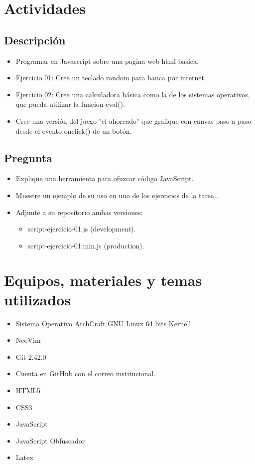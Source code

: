 \section{Actividades}
\subsection{Descripción}
\begin{itemize}
  \item Programar en Javascript sobre una pagina web html basica.
  \item Ejercicio 01: Cree un teclado random para banca por internet.
  \item Ejercicio 02: Cree una calculadora básica como la de los sistemas operativos, que pueda utilizar la funcion eval().
  \item Cree una versión del juego "el ahorcado" que grafique con canvas paso a paso desde el evento onclick() de un botón.
\end{itemize}
\subsection{Pregunta}
\begin{itemize}
  \item Explique una herramienta para ofuzcar código JavaScript.
  \item Muestre un ejemplo de su uso en uno de los ejercicios de la tarea..
  \item Adjunte a su repositorio ambas versiones: 
  \begin{itemize}
    \item script-ejercicio-01.js (development).
    \item script-ejercicio-01.min.js (production).
  \end{itemize}
\end{itemize}

	\section{Equipos, materiales y temas utilizados}
	\begin{itemize}
		\item Sistema Operativo ArchCraft GNU Linux 64 bits Kernell
		\item NeoVim
		\item Git 2.42.0
		\item Cuenta en GitHub con el correo institucional.
    \item HTML5
    \item CSS3
    \item JavaScript
    \item JavaScript Obfuscador
    \item Latex
	\end{itemize}
